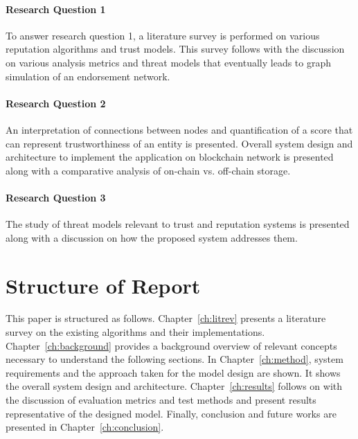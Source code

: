 \paragraph{Research Question 1}
To answer research question 1, a literature survey is performed on various
reputation algorithms and trust models. This survey follows with the discussion
on various analysis metrics and threat models that eventually leads to graph
simulation of an endorsement network.

\paragraph{Research Question 2 } 
An interpretation of connections between nodes and quantification of a score
that can represent trustworthiness of an entity is presented. Overall system
design and architecture to implement the application on blockchain network is
presented along with a comparative analysis of on-chain vs. off-chain storage.  

\paragraph{Research Question 3} 
The study of threat models relevant to trust and reputation systems is
presented along with a discussion on how the proposed system addresses them. 
%


\section{Structure of Report}
This paper is structured as follows. Chapter~\ref{ch:litrev} presents a
literature survey on the existing algorithms and their implementations.
Chapter~\ref{ch:background} provides a background overview of relevant concepts
necessary to understand the following sections. In Chapter~\ref{ch:method},
system requirements and the approach taken for the model design are shown. It
shows the overall system design and architecture. Chapter~\ref{ch:results}
follows on with the discussion of evaluation metrics and test methods and
present results representative of the designed model. Finally, conclusion and
future works are presented in Chapter~\ref{ch:conclusion}. 
